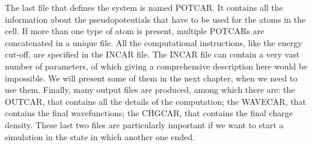 The last file that defines the system is named POTCAR. It contains all the information about the pseudopotentials that have to be used for the atoms in the cell. If more than one type of atom is present, multiple POTCARs are concatenated in a unique file. All the computational instructions, like the energy cut-off, are specified in the INCAR file. The INCAR file can contain a very vast number of parameters, of which giving a comprehensive description here would be impossible. We will  present some of them in the next chapter, when we need to use them. Finally, many output files are produced, among which there are: the OUTCAR, that contains all the details of the computation; the WAVECAR, that contains the final wavefunctions; the CHGCAR, that contains the final charge density. These last two files are particularly important if we want to start a simulation in the state in which another one ended.